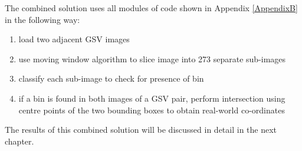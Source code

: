 The combined solution uses all modules of code shown in Appendix \ref{AppendixB} in the following way:

\begin{enumerate}
    \item load two adjacent GSV images
    \item use moving window algorithm to slice image into 273 separate sub-images
    \item classify each sub-image to check for presence of bin
    \item if a bin is found in both images of a GSV pair, perform intersection using centre points of the two bounding boxes to obtain real-world co-ordinates
\end{enumerate}

The results of this combined solution will be discussed in detail in the next chapter.

